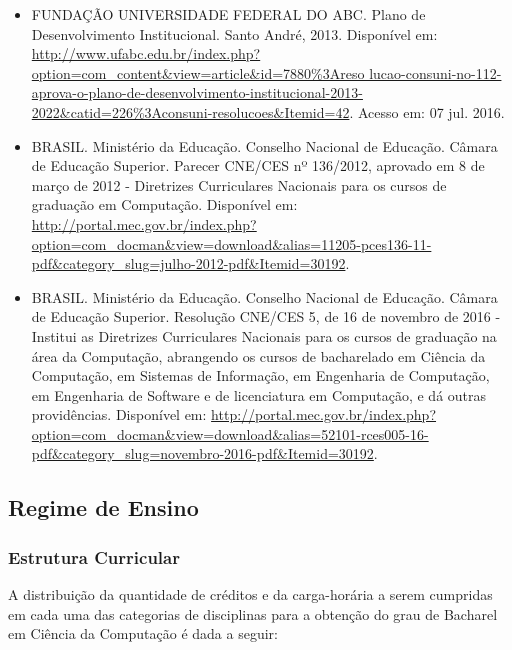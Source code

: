 \begin{itemize}
	\item FUNDAÇÃO UNIVERSIDADE FEDERAL DO ABC. Plano de Desenvolvimento
	Institucional. Santo André, 2013. Disponível em: \url{http://www.ufabc.edu.br/index.php?option=com_content&view=article&id=7880%
		lucao-consuni-no-112-aprova-o-plano-de-desenvolvimento-institucional-2013-
		2022&catid=226%
	
	\item BRASIL. Ministério da Educação. Conselho Nacional de Educação. Câmara de Educação Superior. Parecer CNE/CES nº 136/2012, aprovado em 8 de março de
	2012 - Diretrizes Curriculares Nacionais para os cursos de graduação em Computação. Disponível em: \url{http://portal.mec.gov.br/index.php?option=com_docman&view=download&alias=11205-pces136-11-pdf&category_slug=julho-2012-pdf&Itemid=30192}.
	
	\item BRASIL. Ministério da Educação. Conselho Nacional de Educação. Câmara de Educação Superior. Resolução CNE/CES 5, de 16 de novembro de 2016 - Institui as Diretrizes Curriculares Nacionais para os cursos de graduação na área da Computação, abrangendo os cursos de bacharelado em Ciência da Computação, em Sistemas de Informação, em Engenharia de Computação, em Engenharia de Software e de licenciatura em Computação, e dá outras providências. Disponível em: \url{http://portal.mec.gov.br/index.php?option=com_docman&view=download&alias=52101-rces005-16-pdf&category_slug=novembro-2016-pdf&Itemid=30192}.
	
\end{itemize}


\subsection{Regime de Ensino}

\subsubsection{Estrutura Curricular}
A distribuição da quantidade de créditos e da carga-horária a serem cumpridas em cada uma das categorias de disciplinas para a obtenção do grau de Bacharel em Ciência da Computação é dada a seguir:

